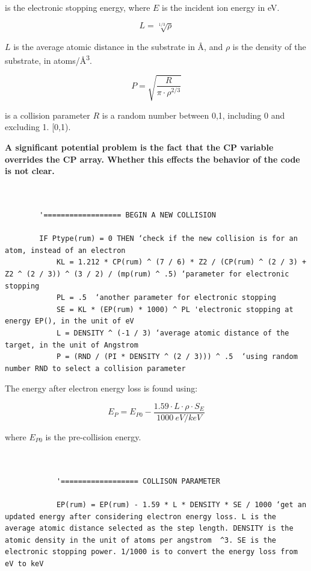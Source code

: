 \documentclass[10pt, reqno]{exam}
\begin{document}
is the electronic stopping energy, where $E$ is the incident ion energy in eV. \par

\begin{equation}
    L = \sqrt[1/3]{\rho}
\end{equation}

$L$ is the average atomic distance in the substrate in \si{\angstrom}, and $\rho$ is the density of the substrate, in \si{atoms/\angstrom^{3}}.

\begin{equation}
    P = \sqrt{\frac{R}{\pi \cdot \rho^{2/3}}}
\end{equation}

is a collision parameter $R$ is a random number between 0,1, including 0 and excluding 1. [0,1).

\textbf{A significant potential problem is the fact that the CP variable overrides the CP array. Whether this effects the behavior of the code is not clear.}

\begin{verbatim}   

    
        '================== BEGIN A NEW COLLISION
    
        IF Ptype(rum) = 0 THEN ‘check if the new collision is for an atom, instead of an electron
            KL = 1.212 * CP(rum) ^ (7 / 6) * Z2 / (CP(rum) ^ (2 / 3) + Z2 ^ (2 / 3)) ^ (3 / 2) / (mp(rum) ^ .5) ‘parameter for electronic stopping
            PL = .5  ‘another parameter for electronic stopping
            SE = KL * (EP(rum) * 1000) ^ PL 'electronic stopping at energy EP(), in the unit of eV
            L = DENSITY ^ (-1 / 3) ‘average atomic distance of the target, in the unit of Angstrom
            P = (RND / (PI * DENSITY ^ (2 / 3))) ^ .5  ‘using random number RND to select a collision parameter
\end{verbatim}

The energy after electron energy loss is found using:

\begin{equation}
    E_P = E_{P0} - \frac{1.59\cdot L \cdot \rho \cdot S_E}{\SI{1000}{eV/keV}}
\end{equation}

where $E_{P0}$ is the pre-collision energy. 

\begin{verbatim}   

    
            '================== COLLISON PARAMETER
    
            EP(rum) = EP(rum) - 1.59 * L * DENSITY * SE / 1000 ‘get an updated energy after considering electron energy loss. L is the average atomic distance selected as the step length. DENSITY is the atomic density in the unit of atoms per angstrom  ^3. SE is the electronic stopping power. 1/1000 is to convert the energy loss from eV to keV
\end{verbatim}
\end{document}
